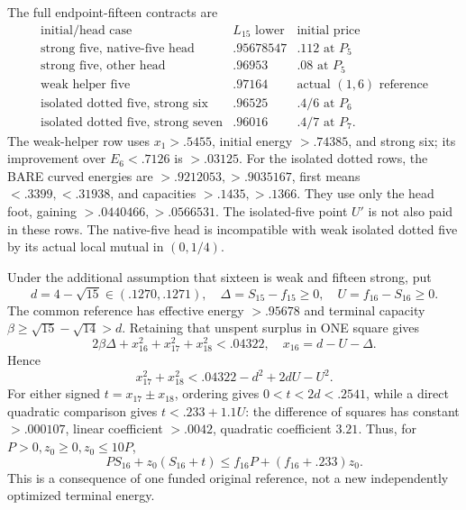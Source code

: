 The full endpoint-fifteen contracts are
\[
\begin{array}{c|c|c}
\text{initial/head case}&L_{15}\text{ lower}&\text{initial price}\\ \hline
\text{strong five, native-five head}&.95678547&.112\text{ at }P_5\\
\text{strong five, other head}&.96953&.08\text{ at }P_5\\
\text{weak helper five}&.97164&\text{actual }(1,6)\text{ reference}\\
\text{isolated dotted five, strong six}&.96525&.4/6\text{ at }P_6\\
\text{isolated dotted five, strong seven}&.96016&.4/7\text{ at }P_7 .
\end{array}
\]
The weak-helper row uses \(x_1>.5455\), initial energy \(>.74385\),
and strong six; its improvement over \(E_6<.7126\) is \(>.03125\).
For the isolated dotted rows, the BARE curved energies are
\(>.9212053,>.9035167\), first means \(<.3399,<.31938\),
and capacities \(>.1435,>.1366\).
They use only the head foot, gaining \(>.0440466,>.0566531\).
The isolated-five point \(U'\) is not also paid in these rows.
The native-five head is incompatible with weak isolated dotted five
by its actual local mutual in \((0,1/4)\).

Under the additional assumption that sixteen is weak and fifteen strong,
put
\[
 d=4-\sqrt{15}\in(.1270,.1271),\quad
 \Delta=S_{15}-f_{15}\geq0,\quad U=f_{16}-S_{16}\geq0 .
\]
The common reference has effective energy \(>.95678\)
and terminal capacity \(\beta\geq\sqrt{15}-\sqrt{14}>d\).
Retaining that unspent surplus in ONE square gives
\[
 2\beta\Delta+x_{16}^2+x_{17}^2+x_{18}^2<.04322,\quad
 x_{16}=d-U-\Delta .
\]
Hence
\[
 x_{17}^2+x_{18}^2<.04322-d^2+2dU-U^2 .
\]
For either signed \(t=x_{17}\pm x_{18}\), ordering gives
\(0<t<2d<.2541\), while a direct quadratic comparison gives
\(t<.233+1.1U\):
the difference of squares has constant \(>.000107\),
linear coefficient \(>.0042\), quadratic coefficient \(3.21\).
Thus, for \(P>0,z_0\geq0,z_0\leq10P\),
\begin{equation}\label{eq:D18centerellipse}
 PS_{16}+z_0(S_{16}+t)
 \leq f_{16}P+(f_{16}+.233)z_0 .
\end{equation}
This is a consequence of one funded original reference, not a new
independently optimized terminal energy.

